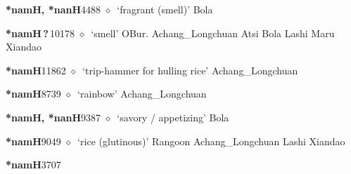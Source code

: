   \begin{list}{}{\leftmargin=1.5em \itemindent=-1.5em}
  \item {\footnotesize \textbf{*namH, *nanH}}{\tiny 4488}
         $\diamond$~`fragrant (smell)'
         Bola 
  \item {\footnotesize \textbf{*namH\,?\,}}{\tiny 10178}
\hspace{1ex}
         $\diamond$~`smell'
         OBur. 
\hspace{1ex}
         Achang\_Longchuan 
\hspace{1ex}
         Atsi 
\hspace{1ex}
         Bola 
\hspace{1ex}
         Lashi 
\hspace{1ex}
         Maru 
\hspace{1ex}
         Xiandao 
  \item {\footnotesize \textbf{*namH}}{\tiny 11862}
\hspace{1ex}
         $\diamond$~`trip-hammer for hulling rice'
         Achang\_Longchuan 
  \item {\footnotesize \textbf{*namH}}{\tiny 8739}
\hspace{1ex}
         $\diamond$~`rainbow'
         Achang\_Longchuan 
  \item {\footnotesize \textbf{*namH, *nanH}}{\tiny 9387}
\hspace{1ex}
         $\diamond$~`savory / appetizing'
         Bola 
  \item {\footnotesize \textbf{*namH}}{\tiny 9049}
\hspace{1ex}
         $\diamond$~`rice (glutinous)'
         Rangoon 
\hspace{1ex}
         Achang\_Longchuan 
\hspace{1ex}
         Lashi 
\hspace{1ex}
         Xiandao 
  \item {\footnotesize \textbf{*namH}}{\tiny 3707}

\end{list}
